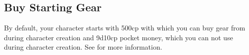 \begin{multicols}{2}
\subsection{Buy Starting Gear}
By default, your character starts with 500cp with which you can buy gear from during character creation and 9d10cp pocket money, which you can not use during character creation.
See  for more information.

\end{multicols}
